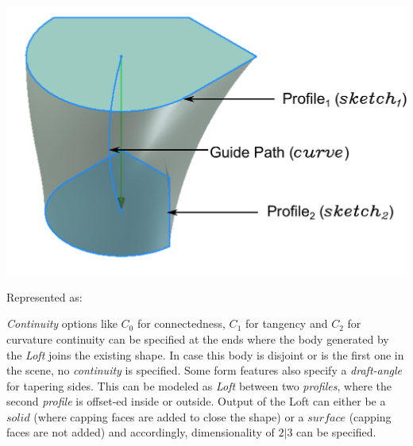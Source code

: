 \begin{minipage}{0.98\linewidth}
	\begin{minipage}[c]{0.4\linewidth}


	\includegraphics[scale=0.35]{../Common/images//LoftPreview.pdf} 

\label{figure_Loft}


	\end{minipage}
\hfill
	\begin{minipage}[c]{0.52\linewidth}
	Represented as:
	\vskip 2mm
	\vskip 2mm
	
	{\em Continuity} options like $C_0$ for connectedness, $C_1$ for tangency and $C_2$ for curvature continuity can be specified at the ends where the body generated by the {\em Loft} joins the existing shape. In case this body is disjoint or is the first one in the scene, no {\em continuity}  is specified. Some form features also specify a {\em draft-angle}  for tapering sides. This can be modeled as {\em Loft} between two {\em profiles}, where the second {\em profile} is offset-ed inside or outside. Output of the Loft can either be a $solid$ (where capping faces are added to close the shape) or a $surface$ (capping faces are not added) and accordingly, dimensionality of $2|3$ can be specified.

	\end{minipage}
\end{minipage}


